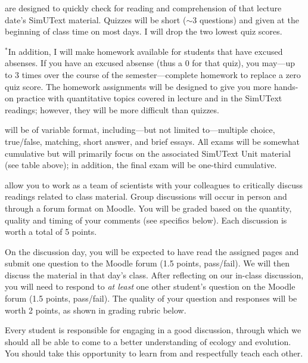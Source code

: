 \documentclass{tufte-handout}
\begin{document}
\begin{fullwidth}	

 are designed to quickly check for reading and comprehension of that lecture date's SimUText material. Quizzes will be short ($\sim$3 questions) and given at the beginning of class time on most days. I will drop the two lowest quiz scores.

$^*$In addition, I will make homework available for students that have excused absenses. If you have an excused absense (thus a 0 for that quiz), you may---up to 3 times over the course of the semester---complete homework to replace a zero quiz score. The homework assignments will be designed to give you more hands-on practice with quantitative topics covered in lecture and in the SimUText readings; however, they will be more difficult than quizzes.
	
\newpage 

 will be of variable format, including---but not limited to---multiple choice, true/false, matching, short answer, and brief essays. All exams will be somewhat cumulative but will primarily focus on the associated SimUText Unit material (see table above); in addition, the final exam will be one-third cumulative. 
					
												
 allow you to work as a team of scientists with your colleagues to critically discuss readings related to class material. Group discussions will occur in person and through a forum format on Moodle. You will be graded based on the quantity, quality and timing of your comments (see specifics below). Each discussion is worth a total of 5 points.

On the discussion day, you will be expected to have read the assigned pages and submit one question to the Moodle forum (1.5 points, pass/fail). We will then discuss the material in that day's class. After reflecting on our in-class discussion, you will need to respond to \emph{at least} one other student's question on the Moodle forum (1.5 points, pass/fail). The quality of your question and responses will be worth 2 points, as shown in grading rubric below.

Every student is responsible for engaging in a good discussion, through which we should all be able to come to a better understanding of ecology and evolution. You should take this opportunity to learn from and respectfully teach each other.


\end{fullwidth}
\end{document}

